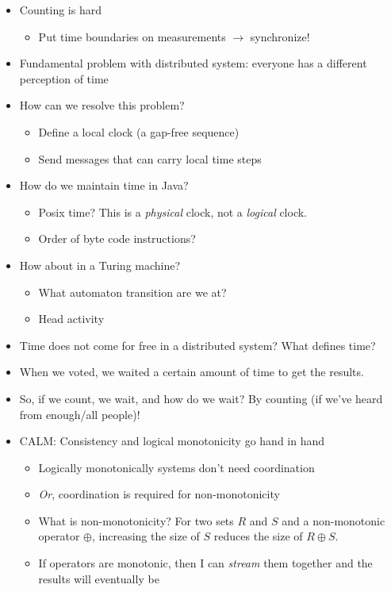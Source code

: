 \documentclass[10pt]{article}
\begin{document}
\begin{itemize}
\item Counting is hard
\begin{itemize}
\item Put time boundaries on measurements $\rightarrow$ synchronize!
\end{itemize}
\item Fundamental problem with distributed system: everyone has a different perception of time
\item How can we resolve this problem?
\begin{itemize}
\item Define a local clock (a gap-free sequence)
\item Send messages that can carry local time steps
\end{itemize}
\item How do we maintain time in Java?
\begin{itemize}
\item Posix time? This is a \emph{physical} clock, not a \emph{logical} clock.
\item Order of byte code instructions?
\end{itemize}
\item How about in a Turing machine?
\begin{itemize}
\item What automaton transition are we at?
\item Head activity
\end{itemize}
\item Time does not come for free in a distributed system? What defines time?
\item When we voted, we waited a certain amount of time to get the results.
\item So, if we count, we wait, and how do we wait? By counting (if we've heard from enough/all people)!
\item CALM: Consistency and logical monotonicity go hand in hand
\begin{itemize}
\item Logically monotonically systems don't need coordination
\item \emph{Or}, coordination is required for non-monotonicity
\item What is non-monotonicity? For two sets $R$ and $S$ and a non-monotonic operator $\oplus$,
increasing the size of $S$ reduces the size of $R \oplus S$.
\item If operators are monotonic, then I can \emph{stream} them together and the results will eventually be

\end{itemize}
\end{itemize}
\end{document}
